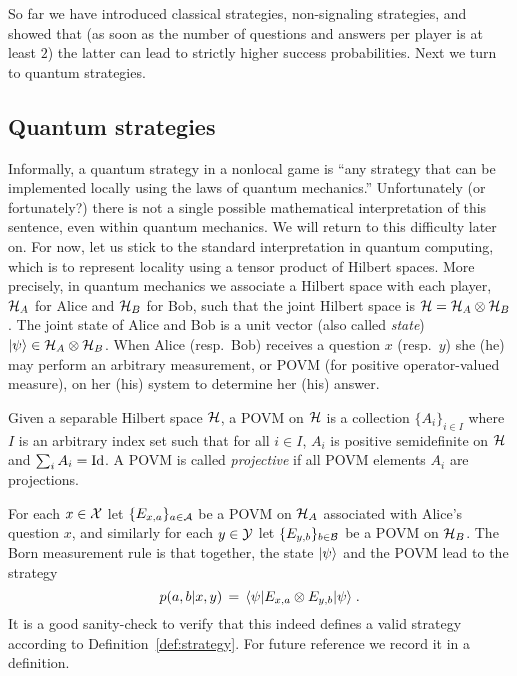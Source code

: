 So far we have introduced classical strategies, non-signaling strategies, and showed that (as soon as the number of questions and answers per player is at least $2$) the latter can lead to strictly higher success probabilities. Next we turn to quantum strategies. 

\subsection{Quantum strategies}

Informally, a quantum strategy in a nonlocal game is ``any strategy that can be implemented locally using the laws of quantum mechanics.'' Unfortunately (or fortunately?) there is not a single possible mathematical interpretation of this sentence, even within quantum mechanics. We will return to this difficulty later on. For now, let us stick to the standard interpretation in quantum computing, which is to represent locality using a tensor product of Hilbert spaces. More precisely, in quantum mechanics we associate a Hilbert space with each player, $\mathcal{H}_A$ for Alice and $\mathcal{H}_B$ for Bob, such that the joint Hilbert space is $\mathcal{H} = \mathcal{H}_A \otimes \mathcal{H}_B$. The joint state of Alice and Bob is a unit vector (also called \emph{state}) $|\psi\rangle \in \mathcal{H}_A \otimes \mathcal{H}_B$. When Alice (resp.\ Bob) receives a question $x$ (resp.\ $y$) she (he) may perform an arbitrary measurement, or POVM (for positive operator-valued measure), on her (his) system to determine her (his) answer. 

\begin{definition}
Given a separable Hilbert space $\mathcal{H}$, a POVM on $\mathcal{H}$ is a collection $\{A_i\}_{i\in I}$ where $I$ is an arbitrary index set such that for all $i\in I$, $A_i$ is positive semidefinite on $\mathcal{H}$ and $\sum_i A_i=\mathop{\rm Id}\nolimits$. A POVM is called \emph{projective} if all POVM elements $A_i$ are projections. 
\end{definition}

For each $x\in \mathcal{X}$ let $\{E_{x,a}\}_{a\in\mathcal{A}}$ be a POVM on $\mathcal{H}_A$ associated with Alice's question $x$, and similarly for each $y\in \mathcal{Y}$ let $\{E_{y,b}\}_{b\in\mathcal{B}}$ be a POVM on $\mathcal{H}_B$. The Born measurement rule is that together, the state $|\psi\rangle$ and the POVM lead to the strategy 
\begin{equation}\label{eq:p-quant}
p(a,b|x,y) \,=\, \langle\psi| E_{x,a} \otimes E_{y,b} |\psi\rangle\;.
\end{equation}
It is a good sanity-check to verify that this indeed defines a valid strategy according to Definition~\ref{def:strategy}. For future reference we record it in a definition. 

